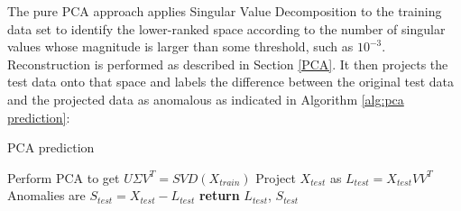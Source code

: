 \documentclass[conference]{IEEEtran}
\begin{document}
The pure PCA approach applies Singular Value Decomposition to  the training data set to identify the lower-ranked space according to the number of singular values whose magnitude is larger than some threshold, such as $10^{-3}$.  Reconstruction is performed as described in Section \ref{PCA}. 
It then projects the test data onto that space and labels the difference between the original test data and the projected data as anomalous as indicated in Algorithm \ref{alg:pca prediction}:

\begin{algorithm}
\caption{PCA prediction}\label{alg:pca prediction}
\begin{algorithmic}[1]
\State Perform PCA to get $U \Sigma V^T = SVD(X_{train})$
\State Project $X_{test}$ as $L_{test} = X_{test} V V^T$
\State Anomalies are $S_{test} = X_{test} - L_{test}$
\State \textbf{return} $L_{test}$, $S_{test}$
\EndProcedure
\end{algorithmic}
\end{algorithm}
\end{document}
